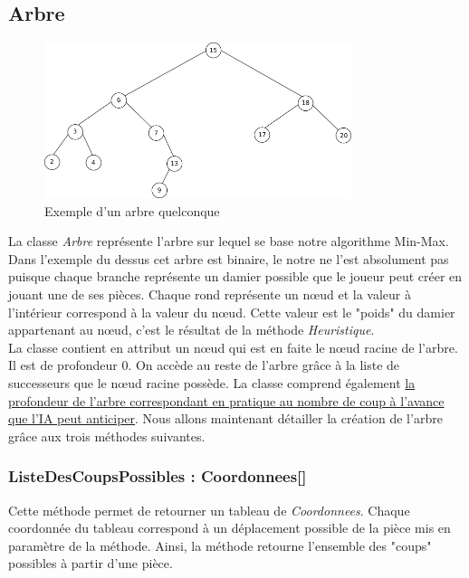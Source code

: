 \documentclass[12,french]{report}
\begin{document}
\subsection{Arbre}

\begin{figure}[H]
	\center
	\includegraphics[width=0.8\textwidth]{./Images/arbre}
	\caption{Exemple d'un arbre quelconque}
\end{figure}\vspace{0.2cm}


La classe \textit{Arbre} représente l'arbre sur lequel se base notre algorithme Min-Max. Dans l'exemple du dessus cet arbre est binaire, le notre ne l'est absolument pas puisque chaque branche représente un damier possible que le joueur peut créer en jouant une de ses pièces. Chaque rond représente un nœud et la valeur à l'intérieur correspond à la valeur du nœud. Cette valeur est le "poids" du damier appartenant au nœud, c'est le résultat de la méthode \textit{Heuristique}.\\

La classe contient en attribut un nœud qui est en faite le nœud racine de l'arbre. Il est de profondeur 0. On accède au reste de l'arbre grâce à la liste de successeurs que le nœud racine possède. La classe comprend également \uline{la profondeur de l'arbre correspondant en pratique au nombre de coup à l'avance que l'IA peut anticiper}. Nous allons maintenant détailler la création de l'arbre grâce aux trois méthodes suivantes.\\

\subsubsection{ListeDesCoupsPossibles : Coordonnees[]}

Cette méthode permet de retourner un tableau de \textit{Coordonnees}. Chaque coordonnée du tableau correspond à un déplacement possible de la pièce mis en paramètre de la méthode. Ainsi, la méthode retourne l'ensemble des "coups" possibles à partir d'une pièce.
\end{document}
